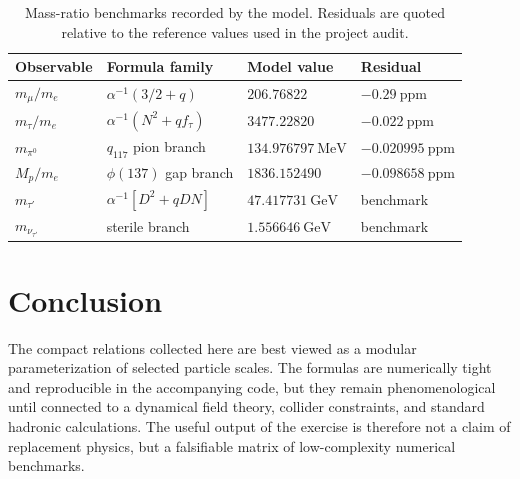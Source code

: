 \documentclass[11pt]{article}
\begin{document}
\begin{table}[h]
\centering
\caption{Mass-ratio benchmarks recorded by the model.  Residuals are quoted
relative to the reference values used in the project audit.}
\begin{tabular}{llll}
\toprule
Observable & Formula family & Model value & Residual \\
\midrule
$m_\mu/m_e$ & $\alpha^{-1}(3/2+q)$ & $206.76822$ & $-0.29~\mathrm{ppm}$ \\
$m_\tau/m_e$ & $\alpha^{-1}(N^2+qf_\tau)$ & $3477.22820$ & $-0.022~\mathrm{ppm}$ \\
$m_{\pi^0}$ & $q_{117}$ pion branch & $134.976797~\mathrm{MeV}$ & $-0.020995~\mathrm{ppm}$ \\
$M_p/m_e$ & $\phi(137)$ gap branch & $1836.152490$ & $-0.098658~\mathrm{ppm}$ \\
$m_{\tau'}$ & $\alpha^{-1}[D^2+qDN]$ & $47.417731~\mathrm{GeV}$ & benchmark \\
$m_{\nu_{\tau'}}$ & sterile branch & $1.556646~\mathrm{GeV}$ & benchmark \\
\bottomrule
\end{tabular}
\end{table}

\section{Conclusion}

The compact relations collected here are best viewed as a modular
parameterization of selected particle scales.  The formulas are numerically
tight and reproducible in the accompanying code, but they remain
phenomenological until connected to a dynamical field theory, collider
constraints, and standard hadronic calculations.  The useful output of the
exercise is therefore not a claim of replacement physics, but a falsifiable
matrix of low-complexity numerical benchmarks.
\end{document}
